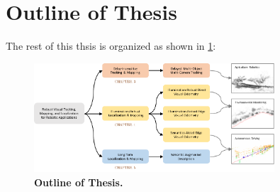 \section{Outline of Thesis}
\label{sec:intro_outlineofthesis}
The rest of this thsis is organized as shown in \ref{fig:intro_overview}:

\begin{figure}
    \centering
	\includegraphics[width=0.8\textwidth]{figures/intro/overview.pdf}
	\caption[Outline of Thesis]{\textbf{Outline of Thesis.}
	\label{fig:intro_overview}}
\end{figure}


